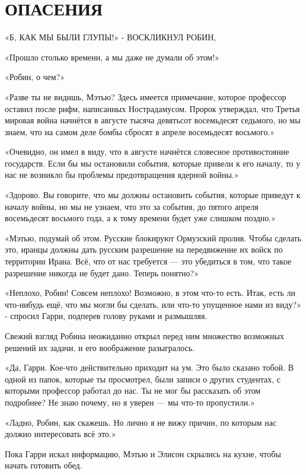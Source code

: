 \documentclass[a4paper,12pt]{book}
\begin{document}
\chapter{ОПАСЕНИЯ}
\noindent\par«Б{, КАК МЫ БЫЛИ ГЛУПЫ!» - ВОСКЛИКНУЛ РОБИН},
\par
«Прошло столько времени, а мы даже не думали об этом!»
\par
«Робин, о чем?»
\par
«Разве ты не видишь, Мэтью? Здесь имеется примечание, которое профессор оставил после рифм, написанных Нострадамусом. Пророк утверждал, что Третья мировая война начнётся в августе тысяча девятьсот восемьдесят седьмого, но мы знаем, что на самом деле бомбы сбросят в апреле восемьдесят восьмого.»
\par
«Очевидно, он имел в виду, что в августе начнётся словесное противостояние государств. Если бы мы остановили события, которые привели к его началу, то у нас не возникло бы проблемы предотвращения ядерной войны.»
\par
«Здорово. Вы говорите, что мы должны остановить события, которые приведут к началу войны, но мы не узнаем, что это за события, до пятого апреля восемьдесят восьмого года, а к тому времени будет уже слишком поздно.»
\par
«Мэтью, подумай об этом. Русские блокируют Ормузский пролив. Чтобы сделать это, иранцы должны дать русским разрешение на передвижение их войск по территории Ирана. Всё, что от нас требуется — это убедиться в том, что такое разрешение никогда не будет дано. Теперь понятно?»
\par
«Неплохо, Робин! Совсем неплохо! Возможно, в этом что-то есть. Итак, есть ли что-нибудь ещё, что мы могли бы сделать, или что-то упущенное нами из виду?» - спросил Гарри, подперев голову руками и размышляя.
\par
Свежий взгляд Робина неожиданно открыл перед ним множество возможных решений их задачи, и его воображение разыгралось.
\par
«Да, Гарри. Кое-что действительно приходит на ум. Это было сказано тобой. В одной из папок, которые ты просмотрел, были записи о других студентах, с которыми профессор работал до нас. Ты не мог бы рассказать об этом подробнее? Не знаю почему, но я уверен — мы что-то пропустили.»
\par
«Ладно, Робин, как скажешь. Но лично я не вижу причин, по которым нас должно интересовать всё это.»
\par
Пока Гарри искал информацию, Мэтью и Элисон скрылись на кухне, чтобы начать готовить обед.
\end{document}

